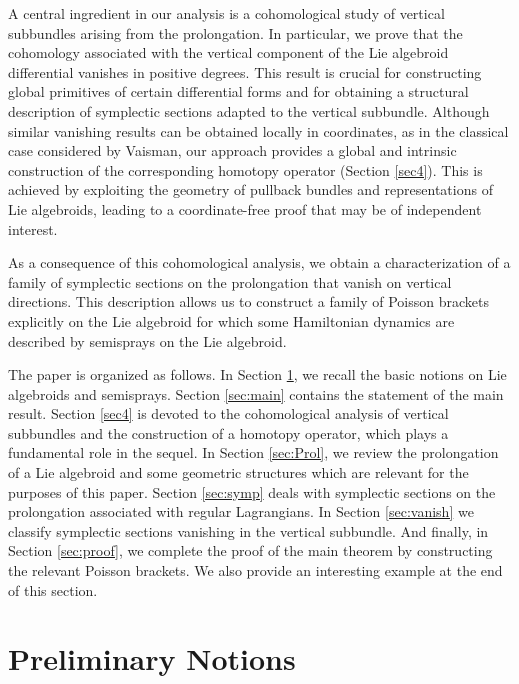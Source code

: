 \documentclass[12pt,letterpaper]{article}
\numberwithin{equation}{section}
\begin{document}
A central ingredient in our analysis is a cohomological study of vertical subbundles
arising from the prolongation. In particular, we prove that the cohomology associated
with the vertical component of the Lie algebroid differential vanishes in positive degrees.
This result is crucial for constructing global primitives of certain differential forms
and for obtaining a structural description of symplectic sections adapted to the vertical
 subbundle. Although similar vanishing results can be obtained locally in coordinates, as in the
classical case considered by Vaisman, our approach provides a global and intrinsic
construction of the corresponding homotopy operator (Section \ref{sec4}). This is achieved by exploiting
the geometry of pullback bundles and representations of Lie algebroids, leading to a
coordinate-free proof that may be of independent interest.

As a consequence of this cohomological analysis, we obtain a characterization of a family
of symplectic sections on the prolongation that vanish on vertical directions. This
description allows us to construct a family of Poisson brackets explicitly on the Lie
algebroid for which some Hamiltonian dynamics are described by semisprays on the Lie algebroid.


The paper is organized as follows. In Section \ref{sec:prelim}, we recall the basic notions on Lie
algebroids and semisprays. Section \ref{sec:main} contains the statement of the main result.
Section \ref{sec4} is devoted to the cohomological analysis of vertical subbundles and the
construction of a homotopy operator, which plays a fundamental role in the sequel.
In Section \ref{sec:Prol}, we review the prolongation of a Lie algebroid and some geometric structures which are relevant for the purposes of this paper.
Section \ref{sec:symp} deals with symplectic sections on the prolongation associated with regular Lagrangians. In Section \ref{sec:vanish} we classify symplectic sections vanishing in the vertical subbundle. And finally, in Section \ref{sec:proof}, we complete the proof of the main theorem by constructing the relevant Poisson brackets. 
We also provide an interesting example at the end of this section.



\section{Preliminary Notions}\label{sec:prelim}
\end{document}
